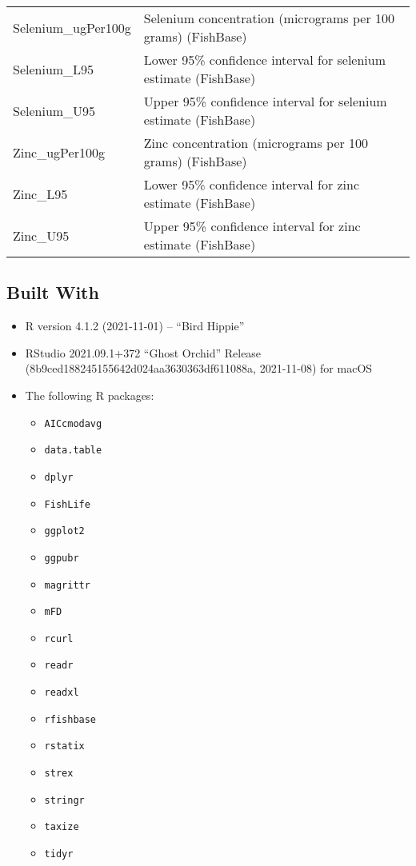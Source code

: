 \documentclass[
]{article}
\begin{document}
\begin{longtable}[]{@{}
  >{\raggedright\arraybackslash}p{}
  >{\raggedright\arraybackslash}p{}@{}}
Selenium\_ugPer100g & Selenium concentration (micrograms per 100 grams)
(FishBase) \\
Selenium\_L95 & Lower 95\% confidence interval for selenium estimate
(FishBase) \\
Selenium\_U95 & Upper 95\% confidence interval for selenium estimate
(FishBase) \\
Zinc\_ugPer100g & Zinc concentration (micrograms per 100 grams)
(FishBase) \\
Zinc\_L95 & Lower 95\% confidence interval for zinc estimate
(FishBase) \\
Zinc\_U95 & Upper 95\% confidence interval for zinc estimate
(FishBase) \\
\bottomrule
\end{longtable}

\hypertarget{built-with}{%
\subsection{Built With}\label{built-with}}

\begin{itemize}
\item
  R version 4.1.2 (2021-11-01) -- ``Bird Hippie''
\item
  RStudio 2021.09.1+372 ``Ghost Orchid'' Release
  (8b9ced188245155642d024aa3630363df611088a, 2021-11-08) for macOS
\item
  The following R packages:

  \begin{itemize}
  \item
    \texttt{AICcmodavg}
  \item
    \texttt{data.table}
  \item
    \texttt{dplyr}
  \item
    \texttt{FishLife}
  \item
    \texttt{ggplot2}
  \item
    \texttt{ggpubr}
  \item
    \texttt{magrittr}
  \item
    \texttt{mFD}
  \item
    \texttt{rcurl}
  \item
    \texttt{readr}
  \item
    \texttt{readxl}
  \item
    \texttt{rfishbase}
  \item
    \texttt{rstatix}
  \item
    \texttt{strex}
  \item
    \texttt{stringr}
  \item
    \texttt{taxize}
  \item
    \texttt{tidyr}
  \end{itemize}
\end{itemize}
\end{document}
